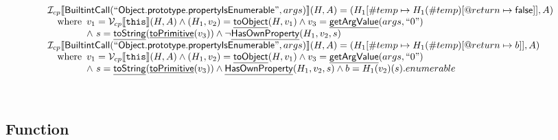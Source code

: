 \documentclass{article}
\makeatletter
\newcommand{\SF}[1]{\mbox{\textsf{#1}}}
\newcommand{\TT}[1]{\mbox{\texttt{#1}}}
\newcommand{\wherec}[1]{{\rm where}\begin{array}[t]{l}#1\end{array}}
\newcommand{\I}{\mathcal{I}}
\newcommand{\V}{\mathcal{V}}
\newcommand{\lbr}{\llbracket}
\newcommand{\rbr}{\rrbracket}
\newcommand{\hf}[1]{\underline{\sf #1}}
\newcommand{\varloc}[1]{\##1}
\newcommand{\varprop}[1]{@#1}
\makeatother
\begin{document}
\[\begin{array}{l}
\I _{cp}\lbr \SF{BuiltintCall}(``\SF{Object.prototype.propertyIsEnumerable}",args)\rbr(H,A)
 = (H_1[\varloc{temp}\mapsto H_1(\varloc{temp})[\varprop{return}\mapsto \SF{false}]], A) \\
\quad\wherec{
  v_1 = \V _{cp}\lbr \TT{this}\rbr (H,A) \land (H_1, v_2) = \hf{toObject}(H, v_1)
  \land v_3 =  \hf{getArgValue}(args, ``0")\\
  \land\ s = \hf{toString}(\hf{toPrimitive}(v_3)) \land \neg \hf{HasOwnProperty}(H_1, v_2, s)
  }\\
  
\I _{cp}\lbr \SF{BuiltintCall}(``\SF{Object.prototype.propertyIsEnumerable}",args)\rbr(H,A)
 = (H_1[\varloc{temp}\mapsto H_1(\varloc{temp})[\varprop{return}\mapsto b]], A) \\
\quad\wherec{
  v_1 = \V _{cp}\lbr \TT{this}\rbr (H,A) \land (H_1, v_2) = \hf{toObject}(H, v_1)
  \land v_3 =  \hf{getArgValue}(args, ``0")\\
  \land\ s = \hf{toString}(\hf{toPrimitive}(v_3)) \land \hf{HasOwnProperty}(H_1, v_2, s)
  \land b = H_1(v_2)(s).enumerable
  }\\
\\\\

\end{array}
\]


\subsection{Function}
\end{document}
